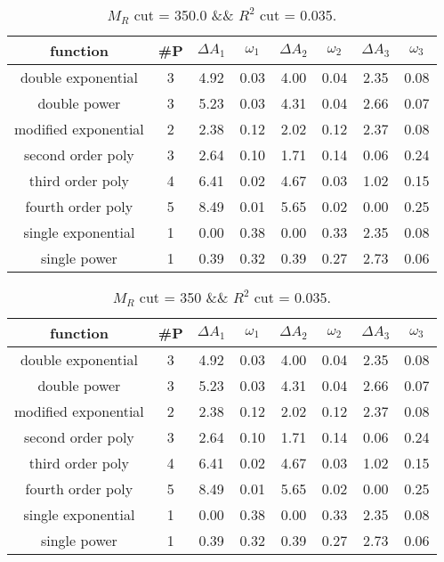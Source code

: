  
\begin{table}[H] 
\begin{center} 
\begin{tabular}{|c|c|cc|cc|cc|} 
\hline function & \#P & $\Delta A_1$ & $\omega_1$ & $\Delta A_2$ & $\omega_2$ & $\Delta A_3$ & $\omega_3$ \\ \hline 
double exponential &  3 &   4.92 &   0.03 &   4.00 &   0.04 &   2.35 &   0.08 \\ 
double power &  3 &   5.23 &   0.03 &   4.31 &   0.04 &   2.66 &   0.07 \\ 
modified exponential &  2 &   2.38 &   0.12 &   2.02 &   0.12 &   2.37 &   0.08 \\ 
second order poly &  3 &   2.64 &   0.10 &   1.71 &   0.14 &   0.06 &   0.24 \\ 
third order poly &  4 &   6.41 &   0.02 &   4.67 &   0.03 &   1.02 &   0.15 \\ 
fourth order poly &  5 &   8.49 &   0.01 &   5.65 &   0.02 &   0.00 &   0.25 \\ 
single exponential &  1 &   0.00 &   0.38 &   0.00 &   0.33 &   2.35 &   0.08 \\ 
single power &  1 &   0.39 &   0.32 &   0.39 &   0.27 &   2.73 &   0.06 \\ 
\hline 
\end{tabular} 
\caption{$M_R$ cut = 350.0 \&\& $R^2$ cut = 0.035.} 
\label{tab:FitChoices_350.0_0.035} 
\end{center} 
\end{table} 
 
 
\begin{table}[H] 
\begin{center} 
\begin{tabular}{|c|c|cc|cc|cc|} 
\hline function & \#P & $\Delta A_1$ & $\omega_1$ & $\Delta A_2$ & $\omega_2$ & $\Delta A_3$ & $\omega_3$ \\ \hline 
double exponential &  3 &   4.92 &   0.03 &   4.00 &   0.04 &   2.35 &   0.08 \\ 
double power &  3 &   5.23 &   0.03 &   4.31 &   0.04 &   2.66 &   0.07 \\ 
modified exponential &  2 &   2.38 &   0.12 &   2.02 &   0.12 &   2.37 &   0.08 \\ 
second order poly &  3 &   2.64 &   0.10 &   1.71 &   0.14 &   0.06 &   0.24 \\ 
third order poly &  4 &   6.41 &   0.02 &   4.67 &   0.03 &   1.02 &   0.15 \\ 
fourth order poly &  5 &   8.49 &   0.01 &   5.65 &   0.02 &   0.00 &   0.25 \\ 
single exponential &  1 &   0.00 &   0.38 &   0.00 &   0.33 &   2.35 &   0.08 \\ 
single power &  1 &   0.39 &   0.32 &   0.39 &   0.27 &   2.73 &   0.06 \\ 
\hline 
\end{tabular} 
\caption{$M_R$ cut = 350 \&\& $R^2$ cut = 0.035.} 
\label{tab:FitChoices_350_0.035} 
\end{center} 
\end{table} 
 
